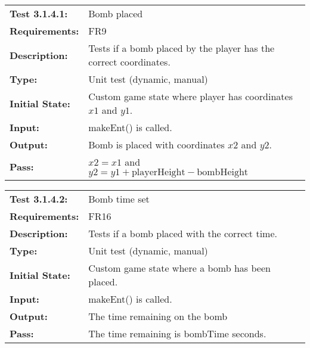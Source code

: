 \documentclass[12pt, titlepage]{article}
\begin{document}
\begin{tabular}{|l|p{10cm}|}
    \hline
    \bf{Test} 3.1.4.1: & Bomb placed \\%
    \bf{Requirements}: & FR9 \\
    \bf{Description}: & Tests if a bomb placed by the player has the correct coordinates. \\
    \bf{Type}: & Unit test (dynamic, manual) \\
    \bf{Initial State}: & Custom game state where player has coordinates $x1$ and $y1$. \\%
    \bf{Input}: & makeEnt() is called. \\
    \bf{Output}: & Bomb is placed with coordinates $x2$ and $y2$. \\
    \bf{Pass}: & $x2 = x1$ and $y2 = y1 + \text{playerHeight} - \text{bombHeight}$\\
    \hline
\end{tabular}

\begin{tabular}{|l|p{10cm}|}
    \hline
    \bf{Test} 3.1.4.2: & Bomb time set \\
    \bf{Requirements}: & FR16 \\
    \bf{Description}: & Tests if a bomb placed with the correct time. \\
    \bf{Type}: & Unit test (dynamic, manual) \\
    \bf{Initial State}: & Custom game state where a bomb has been placed. \\
    \bf{Input}: & makeEnt() is called. \\
    \bf{Output}: & The time remaining on the bomb \\
    \bf{Pass}: & The time remaining is bombTime seconds.\\
    \hline
\end{tabular}

\end{document}
